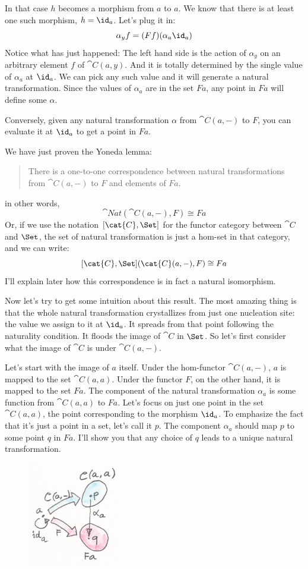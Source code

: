 \noindent
In that case $h$ becomes a morphism from $a$ to
$a$. We know that there is at least one such morphism,
$h = \id_a$. Let's plug it in:
\[\alpha_y f = (F f) (\alpha_a \id_a)\]
Notice what has just happened: The left hand side is the action of
$\alpha_y$ on an arbitrary element $f$ of $\cat{C}(a, y)$. And
it is totally determined by the single value of $\alpha_a$ at
$\id_a$. We can pick any such value and it will generate a natural
transformation. Since the values of $\alpha_a$ are in the set
$F a$, any point in $F a$ will define some $\alpha$.

Conversely, given any natural transformation $\alpha$ from
$\cat{C}(a, -)$ to $F$, you can evaluate it at $\id_a$ to
get a point in $F a$.

We have just proven the Yoneda lemma:

\begin{quote}
There is a one-to-one correspondence between natural transformations
from $\cat{C}(a, -)$ to $F$ and elements of $F a$. 
\end{quote}
in other words,
\[\cat{Nat}(\cat{C}(a, -), F) \cong F a\]
Or, if we use the notation $[\cat{C}, \Set]$ for the functor
category between $\cat{C}$ and $\Set$, the set of natural
transformation is just a hom-set in that category, and we can write:
\[[\cat{C}, \Set](\cat{C}(a, -), F) \cong F a\]
I'll explain later how this correspondence is in fact a natural
isomorphism.

Now let's try to get some intuition about this result. The most amazing
thing is that the whole natural transformation crystallizes from just
one nucleation site: the value we assign to it at $\id_a$. It
spreads from that point following the naturality condition. It floods
the image of $\cat{C}$ in $\Set$. So let's first consider what the
image of $\cat{C}$ is under $\cat{C}(a, -)$.

Let's start with the image of $a$ itself. Under the hom-functor
$\cat{C}(a, -)$, $a$ is mapped to the set $\cat{C}(a, a)$.
Under the functor $F$, on the other hand, it is mapped to the set
$F a$. The component of the natural transformation $\alpha_a$
is some function from $\cat{C}(a, a)$ to $F a$. Let's focus on
just one point in the set $\cat{C}(a, a)$, the point corresponding to
the morphism $\id_a$. To emphasize the fact that it's just a point
in a set, let's call it $p$. The component $\alpha_a$ should map
$p$ to some point $q$ in $F a$. I'll show you that
any choice of $q$ leads to a unique natural transformation.

\begin{figure}[H]
\centering
\includegraphics[width=40mm]{images/yoneda3.png}
\end{figure}

